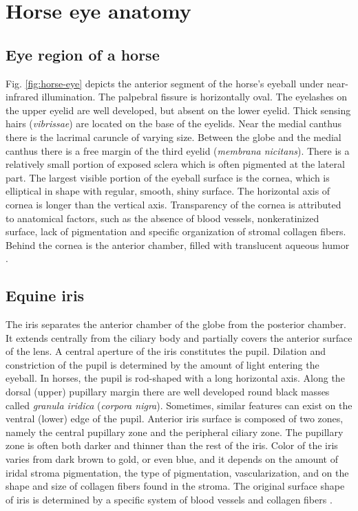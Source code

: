 \documentclass[10pt,twocolumn,letterpaper]{article}
\begin{document}
\section{Horse eye anatomy}
\label{sec:Anatomy}
\subsection{Eye region of a horse}
Fig. \ref{fig:horse-eye} depicts the anterior segment of the horse's eyeball under near-infrared illumination. The palpebral fissure is horizontally oval. The eyelashes on the upper eyelid are well developed, but absent on the lower eyelid. Thick sensing hairs (\emph{vibrissae}) are located on the base of the eyelids. Near the medial canthus there is the lacrimal caruncle of varying size. Between the globe and the medial canthus there is a free margin of the third eyelid (\emph{membrana nicitans}). There is a relatively small portion of exposed sclera which is often pigmented at the lateral part. The largest visible portion of the eyeball surface is the cornea, which is elliptical in shape with regular, smooth, shiny surface. The horizontal axis of cornea is longer than the vertical axis. Transparency of the cornea is attributed to anatomical factors, such as the absence of blood vessels, nonkeratinized surface, lack of pigmentation and specific organization of stromal collagen fibers. Behind the cornea is the anterior chamber, filled with translucent aqueous humor \cite{GilgerEquineOphthalmology2005}\cite{GelatVeterinary2007}.
\subsection{Equine iris}
The iris separates the anterior chamber of the globe from the posterior chamber. It extends centrally from the ciliary body and partially covers the anterior surface of the lens. A central aperture of the iris constitutes the pupil. Dilation and constriction of the pupil is determined by the amount of light entering the eyeball. In horses, the pupil is rod-shaped with a long horizontal axis. Along the dorsal (upper) pupillary margin there are well developed round black masses called \emph{granula iridica} (\emph{corpora nigra}). Sometimes, similar features can exist on the ventral (lower) edge of the pupil. Anterior iris surface is composed of two zones, namely the central pupillary zone and the peripheral ciliary zone. The pupillary zone is often both darker and thinner than the rest of the iris. Color of the iris varies from dark brown to gold, or even blue, and it depends on the amount of iridal stroma pigmentation, the type of pigmentation, vascularization, and on the shape and size of collagen fibers found in the stroma.  The original surface shape of iris is determined by a specific system of blood vessels and collagen fibers \cite{GelatVeterinary2007}.
\end{document}

